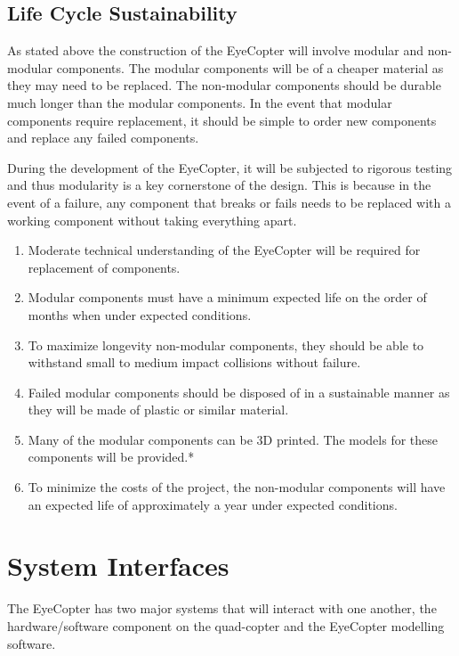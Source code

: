 \documentclass[10pt,letterpaper]{article}
\begin{document}
\subsection{Life Cycle Sustainability}
As stated above the construction of the EyeCopter will involve modular and non-modular components. The modular components will be of a cheaper material as they may need to be replaced. The non-modular components should be durable much longer than the modular components. In the event that modular components require replacement, it should be simple to order new components and replace any failed components. \par
During the development of the EyeCopter, it will be subjected to rigorous testing and thus modularity is a key cornerstone of the design. This is because in the event of a failure, any component that breaks or fails needs to be replaced with a working component without taking everything apart.\par
\begin{enumerate}[label=\textbf{LCS\arabic*}]
	\item Moderate technical understanding of the EyeCopter will be required for replacement of components. 
    \item Modular components must have a minimum expected life on the order of months when under expected conditions.
    \item To maximize longevity non-modular components, they should be able to withstand small to medium impact collisions without failure.
    \item Failed modular components should be disposed of in a sustainable manner as they will be made of plastic or similar material.
    \item Many of the modular components can be 3D printed. The models for these components will be provided.\color{red}*\color{black}
    \item To minimize the costs of the project, the non-modular components will have an expected life of approximately a year under expected conditions.
\end {enumerate}
\newpage

\section{System Interfaces}
The EyeCopter has two major systems that will interact with one another, the hardware/software component on the quad-copter and the EyeCopter modelling software.\par
\end{document}

